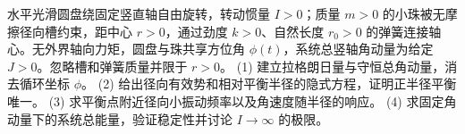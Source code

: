 水平光滑圆盘绕固定竖直轴自由旋转，转动惯量 \(I>0\)；质量 \(m>0\) 的小珠被无摩擦径向槽约束，距中心 \(r>0\)，通过劲度 \(k>0\)、自然长度 \(r_0>0\) 的弹簧连接轴心。无外界轴向力矩，圆盘与珠共享方位角 \(\phi(t)\)，系统总竖轴角动量为给定 \(J>0\)。忽略槽和弹簧质量并限于 \(r>0\)。
(1) 建立拉格朗日量与守恒总角动量，消去循环坐标 \(\phi\)。
(2) 给出径向有效势和相对平衡半径的隐式方程，证明正半径平衡唯一。
(3) 求平衡点附近径向小振动频率以及角速度随半径的响应。
(4) 求固定角动量下的系统总能量，验证稳定性并讨论 \(I\to\infty\) 的极限。
